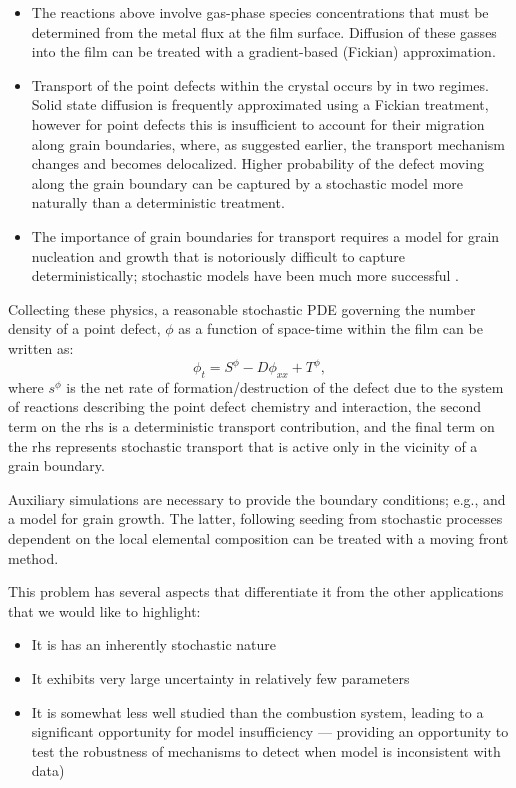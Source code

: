 \documentclass[11pt]{article}
\begin{document}
\begin{itemize}
\item The reactions above involve gas-phase species concentrations that must
be determined from the metal flux at the film surface. Diffusion of
these gasses into the film can be treated with a gradient-based
(Fickian) approximation. 

\item Transport of the point defects within the crystal occurs by in two
regimes. Solid state diffusion is frequently approximated using a
Fickian treatment, however for point defects this is insufficient to
account for their migration along grain boundaries, where, as
suggested earlier, the transport mechanism changes and becomes
delocalized. Higher probability of the defect moving along the grain
boundary can be captured by a stochastic model more naturally than a
deterministic treatment. 

\item The importance of grain boundaries for transport requires a model for
grain nucleation and growth that is notoriously difficult to capture
deterministically; stochastic models have been much more successful \cite{Koptelov84}.

\end{itemize}

Collecting these physics, a reasonable stochastic PDE governing the
number density of a point defect, $\phi$ as a function of space-time
within the film can be written as:
\begin{equation}
  \label{eq:3}
  \phi_t = S^\phi - D \phi_{xx}  + T^\phi,
\end{equation}
where $s^\phi$ is the net rate of formation/destruction of the defect
due to the system of reactions describing the point defect chemistry
and interaction, the second term on the rhs is a deterministic
transport contribution, and the final term on the rhs represents
stochastic transport that is active only in the vicinity of a grain
boundary. 

Auxiliary simulations are necessary to provide the boundary
conditions; e.g., \cite{cigs-parallel-simulation} and a model for
grain growth. The latter, following seeding from stochastic processes
dependent on the local elemental composition can be treated with a
moving front method. 

This problem has several aspects that differentiate it from the other
applications that we would like to highlight: 
\begin{itemize}
\item It is has an inherently stochastic nature
\item It exhibits very large uncertainty in relatively few parameters
\item It is somewhat less well studied than the combustion system,
  leading to a significant opportunity for model insufficiency ---
  providing an opportunity to test the robustness of mechanisms to
  detect when model is inconsistent with data)
\end{itemize}
\end{document}
